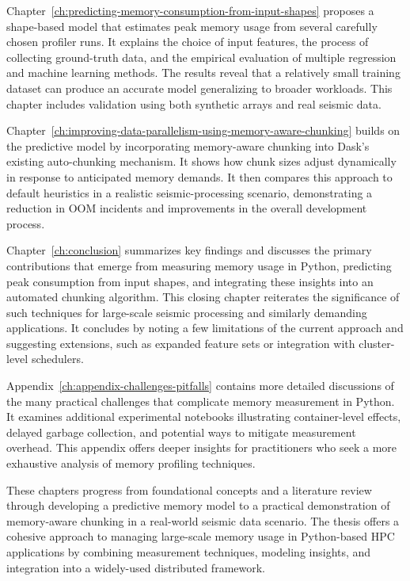 Chapter~\ref{ch:predicting-memory-consumption-from-input-shapes} proposes a shape-based model that estimates peak memory usage from several carefully chosen profiler runs.
It explains the choice of input features, the process of collecting ground-truth data, and the empirical evaluation of multiple regression and machine learning methods.
The results reveal that a relatively small training dataset can produce an accurate model generalizing to broader workloads.
This chapter includes validation using both synthetic arrays and real seismic data.

Chapter~\ref{ch:improving-data-parallelism-using-memory-aware-chunking} builds on the predictive model by incorporating memory-aware chunking into Dask's existing auto-chunking mechanism.
It shows how chunk sizes adjust dynamically in response to anticipated memory demands.
It then compares this approach to default heuristics in a realistic seismic-processing scenario, demonstrating a reduction in \ac{OOM} incidents and improvements in the overall development process.

Chapter~\ref{ch:conclusion} summarizes key findings and discusses the primary contributions that emerge from measuring memory usage in Python, predicting peak consumption from input shapes, and integrating these insights into an automated chunking algorithm.
This closing chapter reiterates the significance of such techniques for large-scale seismic processing and similarly demanding applications.
It concludes by noting a few limitations of the current approach and suggesting extensions, such as expanded feature sets or integration with cluster-level schedulers.

Appendix~\ref{ch:appendix-challenges-pitfalls} contains more detailed discussions of the many practical challenges that complicate memory measurement in Python.
It examines additional experimental notebooks illustrating container-level effects, delayed garbage collection, and potential ways to mitigate measurement overhead.
This appendix offers deeper insights for practitioners who seek a more exhaustive analysis of memory profiling techniques.

These chapters progress from foundational concepts and a literature review through developing a predictive memory model to a practical demonstration of memory-aware chunking in a real-world seismic data scenario.
The thesis offers a cohesive approach to managing large-scale memory usage in Python-based \ac{HPC} applications by combining measurement techniques, modeling insights, and integration into a widely-used distributed framework.